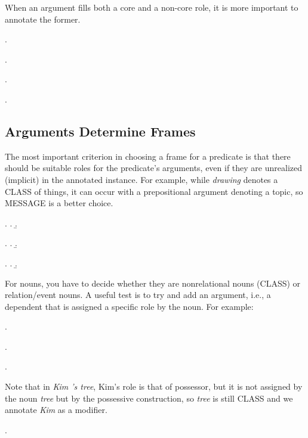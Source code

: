 \documentclass[a4paper]{article}
\newcommand{\fr}[1]{\textsf{#1}}
\newcommand{\rl}[1]{\textsf{#1}}
\begin{document}
When an argument fills both a core and a non-core role, it is more important to
annotate the former.

\ex.

\ex.

\ex.

\ex.

\newpage\subsection{Arguments Determine Frames}

The most important criterion in choosing a frame for a predicate is that there
should be suitable roles for the predicate's arguments, even if they are
unrealized (implicit) in the annotated instance. For example, while
\emph{drawing} denotes a \fr{CLASS} of things, it can occur with a
prepositional argument denoting a \rl{topic}, so \fr{MESSAGE} is a better
choice.

\ex.
\a.
\b.

\ex.
\a.
\b.

\ex.
\a.
\b.

For nouns, you have to decide whether they are nonrelational nouns (\fr{CLASS}) or relation/event nouns. A useful test is to try and add an argument, i.e., a dependent that is assigned a specific role by the noun. For example:

\ex.

\ex.

\ex.

Note that in \emph{Kim 's tree}, Kim's role is that of \rl{possessor}, but it is not assigned by the noun \emph{tree} but by the possessive construction, so \emph{tree} is still \fr{CLASS} and we annotate \emph{Kim} as a modifier.

\ex.
\end{document}
